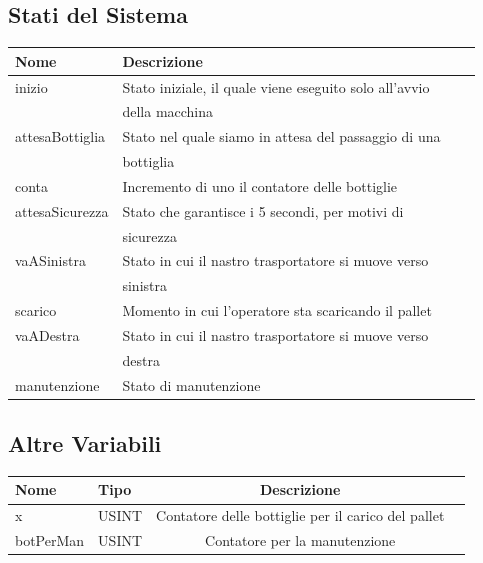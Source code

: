 \documentclass{article}
\begin{document}
\subsection{Stati del Sistema}
\begin{center}
    \begin{tabular}{l l l l }
        \toprule
        \textbf{Nome}   & \textbf{Descrizione}                                   \\
        \midrule
        \midrule
        inizio          & Stato iniziale, il quale viene eseguito solo all'avvio \\
                        & della macchina                                         \\
        \midrule
        attesaBottiglia & Stato nel quale siamo in attesa del passaggio di una   \\
                        & bottiglia                                              \\
        \midrule
        conta           & Incremento di uno il contatore delle bottiglie         \\
        \midrule
        attesaSicurezza & Stato che garantisce i 5 secondi, per motivi di        \\
                        & sicurezza                                              \\
        \midrule
        vaASinistra     & Stato in cui il nastro trasportatore si muove verso    \\
                        & sinistra                                               \\
        \midrule
        scarico         & Momento in cui l'operatore sta scaricando il pallet    \\
        \midrule
        vaADestra       & Stato in cui il nastro trasportatore si muove verso    \\
                        & destra                                                 \\
        \midrule
        manutenzione    & Stato di manutenzione                                  \\
        \bottomrule
    \end{tabular}
    \label{tab:stati}
\end{center}

\subsection{Altre Variabili}
\begin{center}
    \begin{tabular}{l l c l}
        \toprule
        \textbf{Nome} & \textbf{Tipo} & \textbf{Descrizione}                               \\
        \midrule
        \midrule
        x             & USINT         & Contatore delle bottiglie per il carico del pallet \\
        \midrule
        botPerMan     & USINT         & Contatore per la manutenzione                      \\
        \bottomrule
    \end{tabular}
\end{center}
\end{document}
